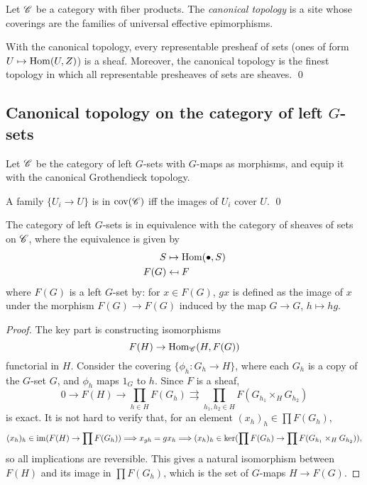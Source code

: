 \documentclass[11pt]{amsart}
\begin{document}
\begin{defn}
    Let $\mathscr{C}$ be a category with fiber products. The \emph{canonical topology} is a site whose coverings are the families of universal effective epimorphisms. 
\end{defn}

\begin{prop}
    With the canonical topology, every representable presheaf of sets (ones of form $U\mapsto \operatorname{Hom}(U,Z)$) is a sheaf. Moreover, the canonical topology is the finest topology in which all representable presheaves of sets are sheaves. \qed
\end{prop}

\subsection{Canonical topology on the category of left $G$-sets}

Let $\mathscr{C}$ be the category of left $G$-sets with $G$-maps as morphisms, and equip it with the canonical Grothendieck topology.


\begin{prop}
    A family $\{U_i\to U\}$ is in $\operatorname{cov}(\mathscr{C})$ iff the images of $U_i$ cover $U$. \qed
\end{prop}



\begin{prop}
\label{G_sets_equiv_sheaves_sets}
    The category of left $G$-sets is in equivalence with the category of sheaves of sets on $\mathscr{C}$, where the equivalence is given by
    \begin{align*}
        S &\mapsto \operatorname{Hom}(\bullet, S) \\
        F(G) &\mapsfrom F
    \end{align*}
    where $F(G)$ is a left $G$-set by: for $x\in F(G)$, $gx$ is defined as the image of $x$ under the morphism $F(G)\to F(G)$ induced by the map $G\to G$, $h\mapsto hg$.
\end{prop}

\begin{proof}
    The key part is constructing isomorphisms
    \[F(H) \to \operatorname{Hom}_{\mathscr{C}}(H, F(G))\]
    functorial in $H$. Consider the covering $\{\phi_h: G_h\to H\}$, where each $G_h$ is a copy of the $G$-set $G$, and $\phi_h$ maps $1_G$ to $h$. Since $F$ is a sheaf,
    \[0 \to F(H) \to \prod_{h\in H} F(G_h) \rightrightarrows \prod_{h_1,h_2\in H} F(G_{h_1}\times_H G_{h_2})\]
    is exact. It is not hard to verify that, for an element $(x_h)_h\in \prod F(G_h)$,
    \[(x_h)_h \in \operatorname{im}(F(H)\to \prod F(G_h)) \Longrightarrow x_{gh} = gx_h \Longrightarrow (x_h)_h\in \ker(\prod F(G_h) \to \prod F(G_{h_1}\times_H G_{h_2})),\]
    so all implications are reversible. This gives a natural isomorphism between $F(H)$ and its image in $\prod F(G_h)$, which is the set of $G$-maps $H\to F(G)$.
\end{proof}
\end{document}
